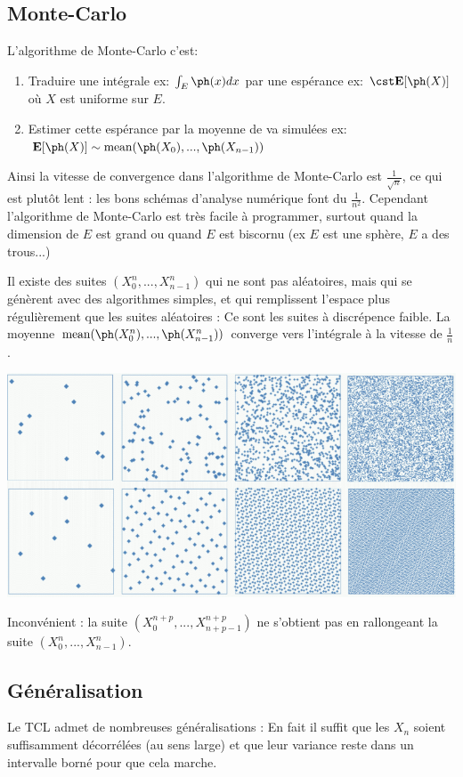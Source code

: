 \documentclass{article}
\def\mean{\mathrm{mean}}
\begin{document}
\subsection{Monte-Carlo}

L'algorithme de Monte-Carlo c'est:   
\begin{enumerate}
\item Traduire une intégrale ex:  $\int_E \ph(x) dx$ par une espérance ex: $\cst \mathbf E[\ph(X)]$ où $X$ est uniforme sur $E$. 
\item Estimer cette espérance par la moyenne de va simulées ex: $ \mathbf E[\ph(X)] \sim \mean(\ph(X_0),...,\ph(X_{n-1}))$
\end{enumerate}
Ainsi la vitesse de convergence dans l'algorithme de Monte-Carlo est $ \frac {1}{\sqrt{n}}$, ce qui est plutôt lent : les bons schémas d'analyse numérique font du  $ \frac {1}{n^2}$. Cependant l'algorithme de Monte-Carlo est très facile à programmer, surtout quand la dimension de $E$ est grand  ou quand $E$ est  biscornu (ex $E$ est une sphère, $E$ a des trous...)


Il existe des suites $(X^n_0,...,X^n_{n-1})$  qui ne sont pas aléatoires, mais qui se génèrent avec des algorithmes simples, et qui remplissent l'espace plus régulièrement que les suites aléatoires : Ce sont les suites à discrépence faible. La moyenne $\mean(\ph(X^n_0),...,\ph(X^n_{n-1}))$ converge vers  l'intégrale à la vitesse de $\frac 1 n$.  

\includegraphics[width=0.7\linewidth]{graph/discrep}


Inconvénient : la suite $(X^{n+p}_0,...,X^{n+p}_{n+p-1})$ ne s'obtient pas en rallongeant la suite  $(X^n_0,...,X^n_{n-1})$. 



\subsection{Généralisation}



Le TCL  admet de nombreuses généralisations : En fait il suffit que les $X_n$ soient suffisamment décorrélées (au sens large) et que leur variance reste dans un intervalle borné pour que cela marche. 
\end{document}
